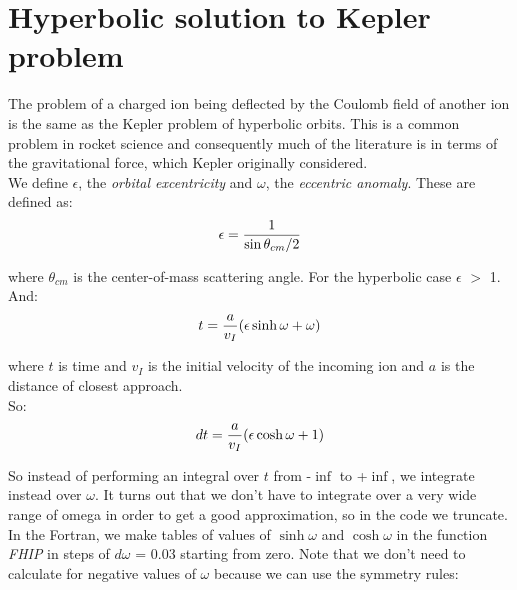 \chapter{Hyperbolic solution to Kepler problem}
\label{chapt:kepler}

The problem of a charged ion being deflected by the Coulomb field of another
ion is the same as the Kepler problem of hyperbolic orbits. This is a common
problem in rocket science and consequently much of the literature is in
terms of the gravitational force, which Kepler originally considered.\\

We define $\epsilon$, the {\em orbital excentricity} and $\omega$, the {\em
eccentric anomaly}. These are defined as:\\

\begin{equation}
\epsilon = {1 \over \sin{\theta_{cm} / 2}}
\end{equation}

where $\theta_{cm}$ is the center-of-mass scattering angle. For the
hyperbolic case $\epsilon$ $>$ 1.\\

And:\\

\begin{equation}
t = {a \over v_I} (\epsilon \sinh \omega + \omega)
\end{equation}

where $t$ is time and $v_I$ is the initial velocity of the incoming ion and
$a$ is the distance of closest approach.\\

So:\\

\begin{equation}
dt = {a \over v_I} (\epsilon \cosh \omega + 1)
\end{equation}

So instead of performing an integral over $t$ from -$\inf$ to +$\inf$, we
integrate instead over $\omega$. It turns out that we don't have to
integrate over a very wide range of omega in order to get a good
approximation, so in the code we truncate.\\

In the Fortran, we make tables of values of $\sinh\omega$ and $\cosh\omega$
in the function {\em FHIP} in steps of $d\omega$ = 0.03 starting from zero.
Note that we don't need to calculate for negative values of $\omega$ because
we can use the symmetry rules:\\

